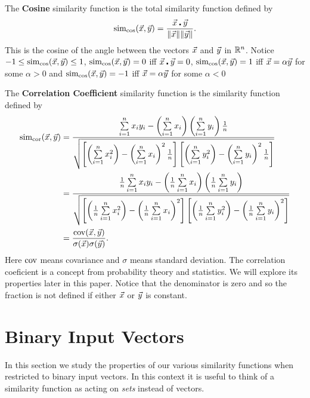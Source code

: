 \documentclass{article}
\begin{document}
\begin{example}
The \textbf{Cosine} similarity function is the total similarity function defined
by
\begin{equation}
\operatorname{sim_{cos}}(\vec{x},\vec{y})=\frac{\vec{x}\centerdot\vec{y}}{\|\vec{x}\|\|\vec{y}\|}.
\end{equation}
This is the cosine of the angle between the vectors $\vec{x}$
and $\vec{y}$ in $\mathbb{R}^n$.
Notice $-1\leq\operatorname{sim_{cos}}(\vec{x},\vec{y})\leq 1$, $\operatorname{sim_{cos}}(\vec{x},\vec{y})=0$ iff
$\vec{x}\centerdot\vec{y}=0$, $\operatorname{sim_{cos}}(\vec{x},\vec{y})=1$ iff $\vec{x}=\alpha\vec{y}$
for some $\alpha>0$ and $\operatorname{sim_{cos}}(\vec{x},\vec{y})=-1$ iff $\vec{x}=\alpha\vec{y}$
for some $\alpha<0$
\end{example}

\begin{example}
The \textbf{Correlation Coefficient} similarity function is the 
similarity function defined by
\begin{equation}
\begin{split}
\operatorname{sim_{cor}}(\vec{x},\vec{y})&=\frac{\sum\limits_{i=1}^{n}x_i y_i - \left(\sum\limits_{i=1}^{n}x_i\right)\left(\sum\limits_{i=1}^{n}y_i\right)\frac{1}{n}}{\sqrt{\left[\left(\sum\limits_{i=1}^{n}x_i^2\right)-\left(\sum\limits_{i=1}^{n}x_i\right)^2\frac{1}{n}\right]\left[\left(\sum\limits_{i=1}^{n}y_i^2\right)-\left(\sum\limits_{i=1}^{n}y_i\right)^2\frac{1}{n}\right]}}\\
&=\frac{\frac{1}{n}\sum\limits_{i=1}^{n}x_i y_i - \left(\frac{1}{n}\sum\limits_{i=1}^{n}x_i\right)\left(\frac{1}{n}\sum\limits_{i=1}^{n}y_i\right)}{\sqrt{\left[\left(\frac{1}{n}\sum\limits_{i=1}^{n}x_i^2\right)-\left(\frac{1}{n}\sum\limits_{i=1}^{n}x_i\right)^2\right]\left[\left(\frac{1}{n}\sum\limits_{i=1}^{n}y_i^2\right)-\left(\frac{1}{n}\sum\limits_{i=1}^{n}y_i\right)^2\right]}}\\
&=\frac{\operatorname{cov}(\vec{x},\vec{y})}{\sigma(\vec{x})\sigma(\vec{y})}.
\end{split}
\end{equation}
Here $\operatorname{cov}$ means covariance and $\sigma$ means standard deviation. The
correlation coeficient is a concept from probability theory and statistics. We
will explore its properties later in this paper. Notice that the denominator is
zero and so the fraction is not defined if either $\vec{x}$ or $\vec{y}$ is
constant.
\end{example}

\section{Binary Input Vectors}
In this section we study the properties of our various similarity functions when
restricted to binary input vectors. In this context it is useful to think of a
similarity function as acting on \emph{sets} instead of vectors.
\end{document}
